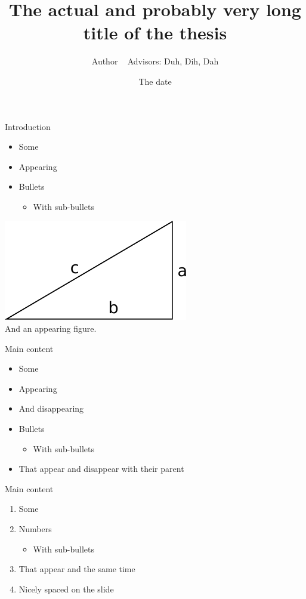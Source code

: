 \documentclass{thesisbeamer}
\title[Short title in footline]{The actual and probably very long title of the thesis}
\author[Name in footline]{Author \newline ~ \newline \normalsize{Advisors: Duh, Dih, Dah}}
\date{The date}
\begin{document}
\MakeTitleNoFoot

\begin{frame}{Introduction}
\begin{itemize}[<+->]
\item Some
\item Appearing
\item Bullets
\begin{itemize}
 \item With sub-bullets
\end{itemize}
\end{itemize} 
 \visible<+-> {
 \begin{center}
  \includegraphics[width=.4\linewidth]{triangle1} \\
  And an appearing figure.
 \end{center}
 }
\end{frame}


\begin{frame}{Main content}
\begin{itemize}[<+>]
\item Some
\item Appearing
  \item And disappearing
\item Bullets
\begin{itemize}[<.>]
 \item With sub-bullets
\end{itemize}
\item That appear and disappear with their parent
\end{itemize}
\end{frame}



\begin{frame}{Main content}
\begin{enumerate}
\item Some	\vfill
\item Numbers
\begin{itemize}
 \item With sub-bullets
\end{itemize}\vfill
\item That appear and the same time\vfill
\item Nicely spaced on the slide
\end{enumerate}
\end{frame}
\end{document}
